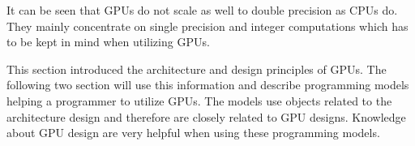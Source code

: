   It can be seen that GPUs do not scale as well to double precision as CPUs do.
  They mainly concentrate on single precision and integer computations which has to be kept in mind when utilizing GPUs.

  \vspace{0.5cm}
  This section introduced the architecture and design principles of GPUs.
  The following two section will use this information and describe programming models helping a programmer to utilize GPUs.
  The models use objects related to the architecture design and therefore are closely related to GPU designs.
  Knowledge about GPU design are very helpful when using these programming models.
  